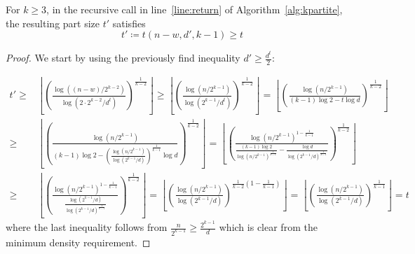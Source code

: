 \begin{lemma}\label{lm:t_prime}
    For $k \geq 3$, in the recursive call in line~\ref{line:return} of Algorithm~\ref{alg:kpartite},
    the resulting part size $t'$ satisfies
    \[
        t' \coloneqq t(n - w, d', k - 1) \geq t
    \]
    
    \begin{proof}

        We start by using the previously find inequality $d' \geq \frac{d^t}{2}$:

        \begin{align*}
            t' \geq &
            \left\lfloor \left(  \frac{\log ((n-w)/2^{k-2})}{\log (2 \cdot 2^{k-2}/d^t)} \right)^
            {\frac{1}{k-2}} \right\rfloor \geq
            \left\lfloor \left(  \frac{\log (n/2^{k-1})}{\log (2^{k-1}/d^t)} \right)^{\frac{1}{k-2}} \right\rfloor =
            \left\lfloor \left(  \frac{\log (n / 2^{k-1})}{(k-1) \log 2 - t \log d} \right)^
            {\frac{1}{k-2}} \right\rfloor \\
            \geq &
            \left\lfloor \left(  \frac{\log (n / 2^{k-1})}
            {(k-1) \log 2 - \left(  \frac{\log (n / 2^{k-1})}{\log (2^{k-1}/d)} \right)^{\frac{1}{k-1}}  \log d} \right)^
            {\frac{1}{k-2}} \right\rfloor
            =
            \left\lfloor \left(  \frac{\log (n / 2^{k-1})^{1-\frac{1}{k-1}}}
            {\frac{(k-1) \log 2}{\log(n / 2^{k-1})^{\frac{1}{k-1}}} - \frac{\log d}{\log (2^{k-1}/d)^{\frac{1}{k-1}}} }
            \right)^{\frac{1}{k-2}} \right\rfloor \\
            \geq &
            \left\lfloor \left(  \frac{\log (n / 2^{k-1})^{1-\frac{1}{k-1}}}
            {\frac{\log (2^{k-1} / d)}{\log(2^{k-1} / d)^{\frac{1}{k-1}}} } \right)^
            {\frac{1}{k-2}} \right\rfloor =
            \left\lfloor \left(  \frac{\log (n / 2^{k-1})}
            {\log (2^{k-1} / d)} \right)^
            {\frac{1}{k-2}\left( 1 - \frac{1}{k-1} \right)} \right\rfloor =
            \left\lfloor \left(  \frac{\log (n / 2^{k-1})}
            {\log (2^{k-1} / d)} \right)^
            {\frac{1}{k-1}} \right\rfloor =
            t
        \end{align*}
        where the last inequality follows from $\frac{n}{2^{k-1}} \geq \frac{2^{k-1}}{d}$
        which is clear from the minimum density requirement.
    \end{proof}
    

\end{lemma}

